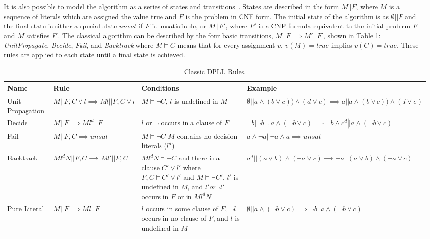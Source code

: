 \documentclass[]{final_report}
\begin{document}
It is also possible to model the algorithm as a series of states and transitions~\cite{nieuwenhuis2006solving}. States are described in the form $M || \mathit{F}$, where $M$ is a sequence of literals which are assigned the value true and $\mathit{F}$ is the problem in CNF form. The initial state of the algorithm is as $\emptyset || \mathit{F}$ and the final state is either a special state $unsat$ if $\mathit{F}$ is unsatisfiable, or $M || F'$, where $F'$ is a CNF formula equivalent to the initial problem $F$ and $M$ satisfies $F'$. The classical algorithm can be described by the four basic transitions, $M || \mathit{F} \implies M' || \mathit{F'} $, shown in Table \ref{table:classic-dpll-rules}: \textit{UnitPropagate}, \textit{Decide}, \textit{Fail}, and \textit{Backtrack} where $M \models C$ means that for every assignment $v$, $v(M) = true$ implies $v(C) = true$. These rules are applied to each state until a final state is achieved.

\begin{table}[t]
\begin{tabular}{|p{2cm}|p{4cm}|p{4cm}|p{4cm}|}
\hline
Name & Rule & Conditions & Example \\ \hline
Unit Propagation & $M|| F, C \lor l \implies M l || F, C \lor l$ & ​$M \models \lnot C $, $l$ is undefined in $M$ & $\emptyset || a \land (b \lor c) ) \land (d \lor e) \implies a || a \land (b \lor c) ) \land (d \lor e) $ \\ \hline
Decide & $M|| F \implies M l^d || F$ & $l$ or $\lnot$ occurs in a clause of $F$ & $ \lnot b | \lnot b ||, a \land (\lnot b \lor c) \implies\lnot b \land c^d ||a \land (\lnot b \lor c) $ \\ \hline
Fail & $M|| F, C \implies unsat$ & $M \models \lnot C$ $M$ contains no decision literals ($l^d$) & $ a \land \lnot a || \lnot a \land a \implies unsat $ \\ \hline
Backtrack & $M l^d N|| F, C \implies M l' || F, C$ & $M l^d N \models \lnot C$ and there is a clause $C' \lor l'$ where $F, C \models C' \lor l'$ and $M \models \lnot C'$, $l'$ is undefined in $M$, and $l' or \lnot l'$ occurs in $F$ or in $M l^d N$ & $a^d || (a \lor b) \land (\lnot{a} \lor c) \implies \lnot{a} || (a \lor b) \land (\lnot{a} \lor c)$  \\ \hline
Pure Literal & $M|| F \implies Ml || F$ & $l$ occurs in some clause of $F$, $\lnot l$ occurs in no clause of $F$, and $l$ is undefined in $M$ & $\emptyset || a \land (\lnot b \lor c) \implies \lnot b || a \land (\lnot b \lor c) $ \\ \hline
\end{tabular}
\caption{Classic DPLL Rules.}
\label{table:classic-dpll-rules}
\end{table}
\end{document}
